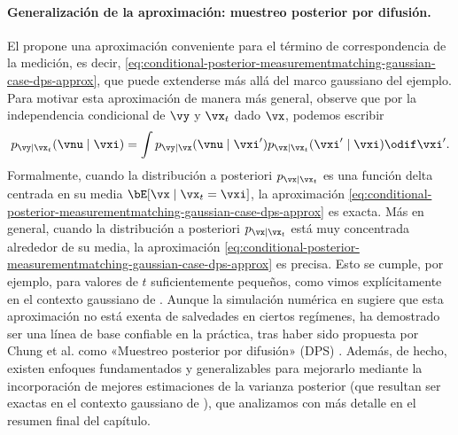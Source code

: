 \documentclass[../../book-main_es.tex]{subfiles}
\begin{document}
\paragraph{Generalización de la aproximación: muestreo posterior por difusión.}
El  propone una aproximación conveniente
para el término de correspondencia de la medición, es decir,
\eqref{eq:conditional-posterior-measurementmatching-gaussian-case-dps-approx},
que puede extenderse más allá del marco gaussiano del ejemplo. Para
motivar esta aproximación de manera más general, observe que
por la independencia condicional de $\vy$ y $\vx_t$ dado $\vx$, podemos escribir
\begin{equation}
    p_{\vy \mid \vx_t}(\vnu \mid \vxi)
    =
    \int p_{\vy \mid \vx}(\vnu \mid \vxi') p_{\vx \mid \vx_t}(\vxi' \mid \vxi)
    \odif  \vxi'.
\end{equation}
Formalmente, cuando la distribución a posteriori $p_{\vx\mid \vx_t}$ es una función delta centrada en
su media $\bE[\vx \mid \vx_t=\vxi]$, la aproximación
\eqref{eq:conditional-posterior-measurementmatching-gaussian-case-dps-approx} es
exacta. Más en general, cuando la distribución a posteriori $p_{\vx \mid \vx_t}$ está muy
concentrada alrededor de su media, la aproximación
\eqref{eq:conditional-posterior-measurementmatching-gaussian-case-dps-approx} es
precisa. Esto se cumple, por ejemplo, para valores de $t$ suficientemente pequeños, como vimos
explícitamente en el contexto gaussiano de
.
Aunque la simulación numérica en
 sugiere que esta
aproximación no está exenta de salvedades en ciertos regímenes, ha demostrado ser
una línea de base confiable en la práctica, tras haber sido propuesta por Chung et al. como
«Muestreo posterior por difusión» (DPS) \cite{chung2023diffusion}.
Además, de hecho, existen enfoques fundamentados y generalizables
para mejorarlo mediante
la incorporación de mejores estimaciones de la varianza posterior (que resultan ser
exactas en el contexto gaussiano de ),
que analizamos con más detalle en el resumen final del capítulo.
\end{document}
